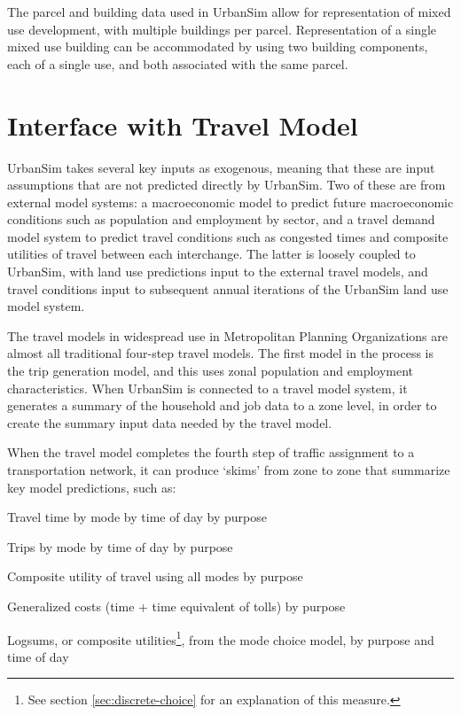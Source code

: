 The parcel and building data used in UrbanSim allow for representation of mixed use development, with multiple buildings per parcel.  Representation
of a single mixed use building can be accommodated by using two building components, each of a single use, and both associated with the same
parcel.

\section{Interface with Travel Model}

UrbanSim takes several key inputs as exogenous, meaning that these
are input assumptions that are not predicted directly by UrbanSim.  Two of these are
from external model systems: a macroeconomic model to predict
future macroeconomic conditions such as population and employment
by sector, and a travel demand model system to predict travel
conditions such as congested times and composite utilities of
travel between each interchange.  The latter is loosely coupled to
UrbanSim, with land use predictions input to the external travel
models, and travel conditions input to subsequent annual
iterations of the UrbanSim land use model system.

The travel models in widespread use in Metropolitan Planning Organizations are
almost all traditional four-step travel models.  The first model in the process
is the trip generation model, and this uses zonal population and employment
characteristics.  When UrbanSim is connected to a travel model system,
it generates a summary of the household and job data to a zone level, in order
to create the summary input data needed by the travel model.

When the travel model completes the fourth step of traffic assignment to a
transportation network, it can produce `skims' from zone to zone that summarize
key model predictions, such as:

\squishlist
\item   Travel time by mode by time of day by purpose
\item Trips by mode by time of day by purpose
\item   Composite utility of travel using all modes by purpose
\item Generalized costs (time + time equivalent of tolls) by purpose
\item Logsums, or composite utilities\footnote{See section \ref{sec:discrete-choice} for an explanation of this measure.}, from the mode choice model, by purpose and time of day
\squishend

